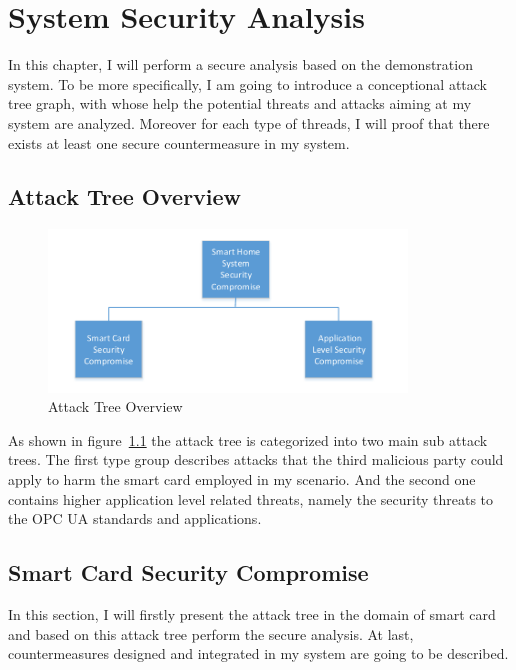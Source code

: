 \chapter{System Security Analysis}
In this chapter, I will perform a secure analysis based on the demonstration system. To be more specifically, I am going to introduce a conceptional attack tree graph, with whose help the potential threats and attacks aiming at my system are analyzed. Moreover for each type of threads, I will proof that there exists at least one secure countermeasure in my system.

\section{Attack Tree Overview}

 \begin{figure}[!htb]
	\centering
	\includegraphics[width=0.85\textwidth]{attack-tree-overview}
		\caption{Attack Tree Overview}
	\label{fig:attack-tree-overview}
\end{figure}
As shown in figure~\ref{fig:attack-tree-overview} the attack tree is categorized into two main sub attack  trees. The first type group describes attacks that the third malicious party could apply to harm the smart card employed in my scenario. And the second one contains higher application level related threats, namely the security threats to the OPC UA standards and applications. 

\section{Smart Card Security Compromise}
In this section, I will firstly present the attack tree in the domain of smart card and based on this attack tree  perform the secure analysis. At last, countermeasures designed and integrated in my system are going to be described.

